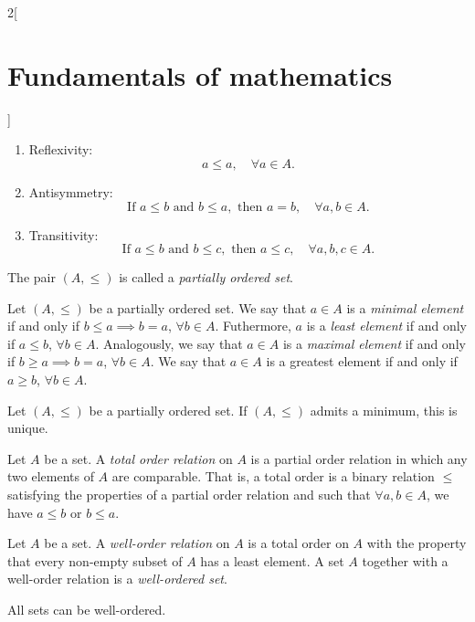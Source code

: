 \documentclass[../../../main.tex]{subfiles}
\begin{document}
\begin{multicols}{2}[\section{Fundamentals of mathematics}]
\begin{definition}
        \begin{enumerate}
            \item Reflexivity:
            $$a\leq a,\quad\forall a\in A.$$
            \item Antisymmetry:
            $$\text{If }a\leq b\text{ and }b\leq a,\text{ then }a=b,\quad\forall a,b\in A.$$
            \item Transitivity:
            $$\text{If }a\leq b\text{ and }b\leq c,\text{ then }a\leq c,\quad\forall a,b,c\in A.$$
        \end{enumerate}
        The pair $(A,\leq)$ is called a \textit{partially ordered set}.
    \end{definition}
    \begin{definition}
        Let $(A,\leq)$ be a partially ordered set. We say that $a\in A$ is a \textit{minimal element} if and only if $b\leq a\implies b=a$, $\forall b\in A$. Futhermore, $a$ is a \textit{least element} if and only if $a\leq b$, $\forall b\in A$. Analogously, we say that $a\in A$ is a \textit{maximal element} if and only if $b\geq a\implies b=a$, $\forall b\in A$. We say that $a\in A$ is a greatest element if and only if $a\geq b$, $\forall b\in A$.
    \end{definition}
    \begin{lemma}
        Let $(A,\leq)$ be a partially ordered set. If $(A,\leq)$ admits a minimum, this is unique. 
    \end{lemma}
    \begin{definition}
        Let $A$ be a set. A \textit{total order relation} on $A$ is a partial order relation in which any two elements of $A$ are comparable. That is, a total order is a binary relation $\leq$ satisfying the properties of a partial order relation and such that $\forall a,b\in A$, we have $a\leq b$ or $b\leq a$.
    \end{definition}
    \begin{definition}
        Let $A$ be a set. A \textit{well-order relation} on $A$ is a total order on $A$ with the property that every non-empty subset of $A$ has a least element. A set $A$ together with a well-order relation is a \textit{well-ordered set}.
    \end{definition}
    \begin{theorem}
        All sets can be well-ordered.
    \end{theorem}

\end{multicols}
\end{document}
